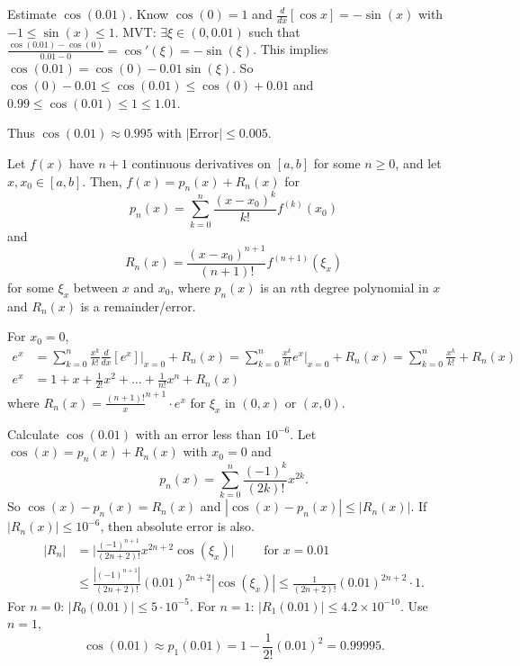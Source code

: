 \documentclass[]{article}
\begin{document}
\begin{example}
	Estimate $\cos(0.01)$.
	Know $\cos(0)=1$ and $\frac{d}{dx}[\cos x] = -\sin(x)$ with $-1\leq \sin(x) \leq 1$.
	MVT: $\exists \xi\in(0,0.01)$ such that $\frac{\cos(0.01)-\cos(0)}{0.01-0} = \cos'(\xi)=-\sin(\xi)$. This implies $\cos(0.01) = \cos(0)-0.01\sin(\xi)$.
	So $\cos(0)-0.01\leq \cos(0.01)\leq \cos(0)+0.01$ and $0.99\leq \cos(0.01)\leq 1\leq 1.01$. 
	
	Thus $\cos(0.01)\approx 0.995$ with $|\text{Error}|\leq 0.005$.
\end{example}

\begin{theorem}
	Let $f(x)$ have $n+1$ continuous derivatives on $[a,b]$ for some $n\geq 0$, and let $x,x_0\in[a,b]$.
	Then, $f(x)=p_n(x)+R_n(x)$ for $$p_n(x) = \sum_{k=0}^n \frac{(x-x_0)^k}{k!}f^{(k)}(x_0)$$ and 
	$$R_n(x) = \frac{(x-x_0)^{n+1}}{(n+1)!} f^{(n+1)}(\xi_x)$$ 
	for some $\xi_x$ between $x$ and $x_0$, where $p_n(x)$ is an $n$th degree polynomial in $x$ and $R_n(x)$ is a remainder/error.
\end{theorem}

\begin{example}
	For $x_0=0$, 
	\begin{align*}
		e^x &= \sum_{k=0}^n \frac{x^k}{k!}\frac{d}{dx}[e^x]\bigg|_{x=0} + R_n(x) 
		= \sum_{k=0}^n \frac{x^k}{k!} e^x \bigg|_{x=0} + R_n(x) 
		= \sum_{k=0}^n \frac{x^k}{k!} + R_n(x) \\
		e^x &= 1+x+\frac{1}{2!}x^2 + \dots + \frac{1}{n!}x^n + R_n(x)
	\end{align*}
	where $R_n(x) = \frac{(n+1)!}x^{n+1}\cdot e^x$ for $\xi_x$ in $(0,x)$ or $(x,0)$.
\end{example}

\begin{example}
	Calculate $\cos(0.01)$ with an error less than $10^{-6}$.
	Let $\cos(x) = p_n(x)+R_n(x)$ with $x_0 = 0$ and $$p_n(x) = \sum_{k=0}^n \frac{(-1)^k}{(2k)!}x^{2k}.$$ %
	So $\cos(x)-p_n(x) = R_n(x)$ and $|\cos(x)-p_n(x)|\leq |R_n(x)|$.
	If $|R_n(x)|\leq 10^{-6}$, then absolute error is also.
	\begin{align*}
		|R_n|&=\bigg|\frac{(-1)^{n+1}}{(2n+2)!}x^{2n+2}\cos(\xi_x)\bigg| \qquad \text{ for } x=0.01 \\
			 &\leq \frac{|(-1)^{n+1}|}{(2n+2)!}(0.01)^{2n+2}|\cos(\xi_x)| 
			 \leq \frac{1}{(2n+2)!}(0.01)^{2n+2}\cdot 1.
	\end{align*}
For $n=0$: $|R_0(0.01)|\leq 5\cdot 10^{-5}$.
For $n=1$: $|R_1(0.01)|\leq 4.2\times 10^{-10}$.
Use $n=1$, $$\cos(0.01)\approx p_1(0.01) = 1-\frac{1}{2!}(0.01)^2 = 0.99995.$$
\end{example}
\end{document}
